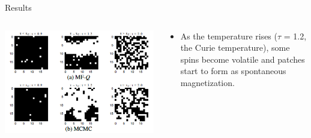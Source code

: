 \begin{frame}{Results}
	\begin{columns}
		\begin{column}{0.7\textwidth}
			\centerline{\includegraphics[width = 1.0\textwidth]{Figures/final.png}}
		\end{column}
		\begin{column}{0.3\textwidth}
			\begin{itemize}
				\item As the
				temperature rises ($\tau$ = 1.2, the Curie temperature), some spins become volatile
				and patches start to form as spontaneous magnetization.
			\end{itemize}
		\end{column}
	\end{columns}

	\end{frame}

